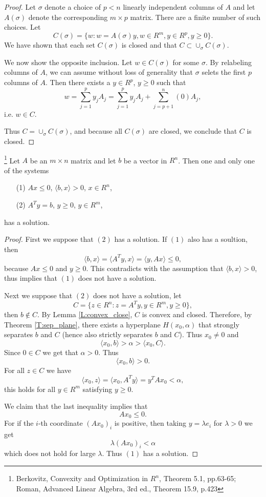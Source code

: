 \begin{proof}
Let $\sigma$ denote a choice of $p<n$ linearly independent columns of $A$ and 
let $A(\sigma)$ denote the corresponding $m\times p$ matrix. There are a finite
number of such choices. Let
\[
  C(\sigma) = \{w: w=A(\sigma) y, w\in R^m, y\in R^p, y\ge 0 \}.
\]
We have shown that each set $C(\sigma)$ is closed and that 
$C\subset \cup_{\sigma} C(\sigma)$.

We now show the opposite inclusion. Let $w\in C(\sigma)$ for some $\sigma$. 
By relabeling columns of $A$, we can assume without loss of generality that
$\sigma$ selets the first $p$ columns of $A$. Then there exists a $y\in R^p$,
$y\ge 0$ such that
\[
  w = \sum_{j=1}^p y_j A_j 
    = \sum_{j=1}^p y_j A_j + \sum_{j=p+1}^n (0) A_j,
\]
i.e. $w\in C$.

Thus $C=\cup_{\sigma} C(\sigma)$, and because all $C(\sigma)$ are closed, we
conclude that $C$ is closed.
\end{proof}


\begin{theorem} \label{T:farkas}
\footnote{Berkovitz, Convexity and Optimization in $R^n$, Theorem 5.1, 
          pp.63-65; Roman, Advanced Linear Algebra, 3rd ed., Theorem 15.9, 
          p.423}
Let $A$ be an $m\times n$ matrix and let $b$ be a vector in $R^n$. Then one 
and only one of the systems
\begin{itemize}
  \item[(1)] $Ax\le 0$, $\langle b,x \rangle >0$, $x\in R^n$,
  \item[(2)] $A^T y=b$, $y\ge 0$, $y\in R^m$,
\end{itemize}
has a solution.
\end{theorem}
\begin{proof}
First we suppose that $(2)$ has a solution. If $(1)$ also has a soultion, then
\[
  \langle b,x \rangle = \langle A^T y, x \rangle = \langle y,Ax \rangle \le 0,
\]
because $Ax\le 0$ and $y\ge 0$. This contradicts with the assumption that
$\langle b,x \rangle >0$, thus implies that $(1)$ does not have a solution.

Next we suppose that $(2)$ does not have a solution, let
\[
  C=\{z\in R^n: z=A^T y, y\in R^m, y\ge 0 \},
\]
then $b\notin C$. By Lemma \ref{L:convex_close}, $C$ is convex and closed. 
Therefore, by Theorem \ref{T:sep_plane}, there exists a hyperplane 
$H(x_0,\alpha)$ that strongly separates $b$ and $C$ (hence also strictly 
separates $b$ and $C$). Thus $x_0\neq 0$ and
\[
  \langle x_0,b \rangle > \alpha > \langle x_0,C \rangle.
\]
Since $0\in C$ we get that $\alpha>0$. Thus 
\[
  \langle x_0,b \rangle >0.
\]
For all $z\in C$ we have
\[
  \langle x_0,z \rangle = \langle x_0,A^T y \rangle = y^T Ax_0 < \alpha,
\]
this holds for all $y\in R^m$ satisfying $y\ge 0$.

We claim that the last inequality implies that 
\[
  Ax_0 \le 0. 
\]
For if the $i$-th coordinate $(Ax_0)_i$ is positive, then taking 
$y=\lambda e_i$ for $\lambda>0$ we get
\[
  \lambda (Ax_0)_i < \alpha
\]
which does not hold for large $\lambda$. Thus $(1)$ has a solution.
\end{proof}
